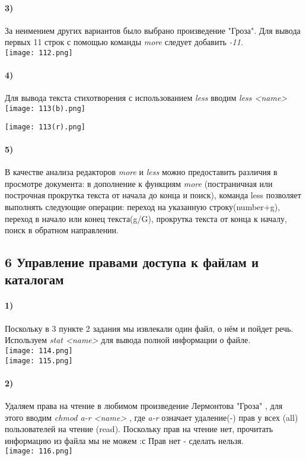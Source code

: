 		\paragraph{3)}
		За неимением других вариантов было выбрано произведение "Гроза". Для вывода 	первых 11 строк с помощью команды \textit{more} следует добавить \textit{-11}.
	\\
	\texttt{[image: 112.png]}
	\\
		\paragraph{4)}
		Для вывода текста стихотворения с использованием \textit{less} вводим 			\textit{less <name>}\\
	\texttt{[image: 113(b).png]}
	\\
	\begin{center}
		\texttt{[image: 113(r).png]}
	\end{center}
	
		\paragraph{5)}
		В качестве анализа редакторов \textit{more} и \textit{less} можно 				предоставить различия в просмотре документа: в дополнение к функциям 				\textit{more}  (постраничная или построчная прокрутка текста от начала до конца 	и поиск), команда less позволяет выполнять следующие операции: переход на 			указанную строку(number+g), переход в начало или  конец текста(g/G), прокрутка 		текста от конца к началу, поиск в обратном направлении.\\
		
	\subsection*{6 Управление правами доступа к файлам и каталогам}
	
		\paragraph{1)}
		Поскольку в 3 пункте 2 задания мы извлекали один файл, о нём и пойдет речь. 	Используем \textit{stat <name>} для вывода полной информации о файле.\\
	\texttt{[image: 114.png]}
	\\
	\texttt{[image: 115.png]}
	\\
		\paragraph{2)}
		Удаляем права на чтение в любимом произведение Лермонтова "Гроза" , для 			этого вводим \textit{chmod a-r <name> }, где \textit{a-r} означает удаление(-) 		прав у всех (all)  пользователей на чтение (read). Поскольку прав на чтение 		нет, прочитать информацию из файла мы не можем :с
	Прав нет - сделать нельзя.\\
	\texttt{[image: 116.png]}
	\\
